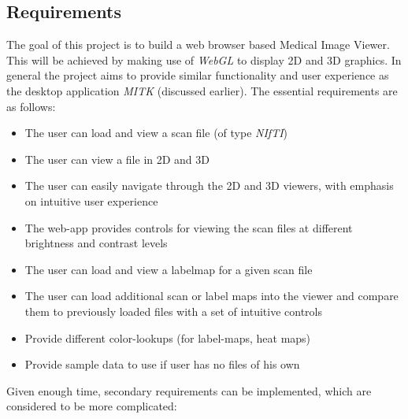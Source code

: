 \documentclass[a4paper,11pt,titlepage]{article}
\begin{document}
\subsection{Requirements}


The goal of this project is to build a web browser based Medical Image Viewer. This will be achieved by making use of \textit{WebGL} to display 2D and 3D graphics. In general the project aims to provide similar functionality and user experience as the desktop application \textit{MITK} (discussed earlier). The essential requirements are as follows:

\begin{itemize}
\item The user can load and view a scan file (of type \textit{NIfTI})
\item The user can view a file in 2D and 3D
\item The user can easily navigate through the 2D and 3D viewers, with emphasis on intuitive user experience
\item The web-app provides controls for viewing the scan files at different brightness and contrast levels
\item The user can load and view a labelmap for a given scan file
\item The user can load additional scan or label maps into the viewer and compare them to previously loaded files with a set of intuitive controls
\item Provide different color-lookups (for label-maps, heat maps)
\item Provide sample data to use if user has no files of his own
\end{itemize}

Given enough time, secondary requirements can be implemented, which are considered to be more complicated:
\end{document}
